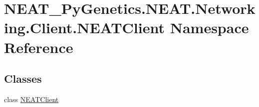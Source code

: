 \hypertarget{namespaceNEAT__PyGenetics_1_1NEAT_1_1Networking_1_1Client_1_1NEATClient}{}\section{N\+E\+A\+T\+\_\+\+Py\+Genetics.\+N\+E\+A\+T.\+Networking.\+Client.\+N\+E\+A\+T\+Client Namespace Reference}
\label{namespaceNEAT__PyGenetics_1_1NEAT_1_1Networking_1_1Client_1_1NEATClient}
\subsection*{Classes}
\begin{DoxyCompactItemize}
\item 
class \hyperlink{classNEAT__PyGenetics_1_1NEAT_1_1Networking_1_1Client_1_1NEATClient_1_1NEATClient}{N\+E\+A\+T\+Client}
\end{DoxyCompactItemize}
